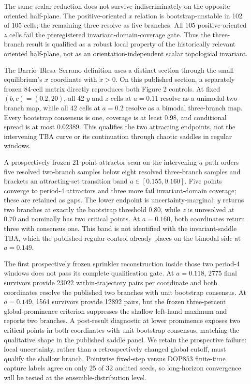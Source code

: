 The same scalar reduction does not survive indiscriminately on the opposite
oriented half-plane.  The positive-oriented $x$ relation is
bootstrap-unstable in 102 of 105 cells; the remaining three resolve as five
branches.  All 105 positive-oriented $z$ cells fail the preregistered
invariant-domain-coverage gate.  Thus the three-branch result is qualified as a
robust local property of the historically relevant oriented half-plane, not as
an orientation-independent scalar topological invariant.

The Barrio--Blesa--Serrano definition uses a distinct section through the small
equilibrium's $x$ coordinate with $\dot{x}>0$.  On this published section, a
separately frozen 84-cell matrix directly reproduces both Figure 2 controls.
At fixed $(b,c)=(0.2,20)$, all 42 $y$ and $z$ cells at $a=0.11$ resolve as a
unimodal two-branch map, while all 42 cells at $a=0.2$ resolve as a bimodal
three-branch map.  Every bootstrap consensus is one, coverage is at least
$0.98$, and conditional spread is at most $0.02389$.  This qualifies the two
attracting endpoints, not the intervening TBA curve or its continuation through
chaotic saddles in regular windows.

A prospectively frozen 21-point attractor scan on the intervening $a$ path
orders five resolved two-branch samples below eight resolved three-branch
samples and brackets an attracting-set transition band
$a\in[0.155,0.160]$.  Five points converge to period-4 attractors and three
more fail invariant-domain coverage; these are retained as gaps.  The lower
endpoint is uncertainty-marginal: $y$ returns two branches at exactly the
bootstrap threshold $0.80$, while $z$ is unresolved at $0.70$ and nominally
has two critical points.  At $a=0.160$, both coordinates return three with
consensus one.  This band is not identified with the invariant-saddle TBA,
which the published regular control already places on the bimodal side at
$a=0.149$.

The first prospectively frozen sprinkler reconstruction inside those two
period-4 windows does not pass its complete qualification gate.  At $a=0.118$,
2775 final survivors provide 23022 within-trajectory pairs per coordinate and
both coordinates resolve the published two branches with unit bootstrap
consensus.  At $a=0.149$, 1564 survivors provide 12892 pairs, but the frozen
three-percent global-prominence criterion suppresses the shallow left-hand
maximum and reports two branches.  A post-result diagnostic at lower
prominence exposes two critical points in both coordinates with unit bootstrap
consensus, matching the qualitative shape in the published saddle panel.  We
retain the prospective failure: local uncertainty, rather than a retrospectively
changed global cutoff, must qualify the shallow branch.  Pointwise fixed-step
versus DOP853 finite-time capture labels agree on only 25 of 32 audited seeds,
so long-horizon convergence will be tested at the ensemble-distribution level.

